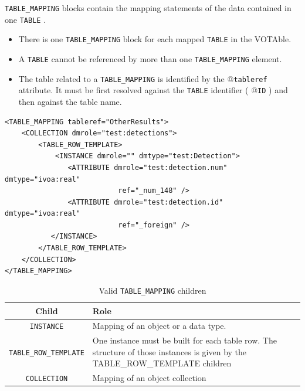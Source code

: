 \documentclass[11pt,a4paper]{ivoa}
\begin{document}
\texttt{TABLE\_MAPPING} blocks contain the mapping statements of the data contained in one \texttt{TABLE} .

\begin{itemize}
    \item There is one \texttt{TABLE\_MAPPING} block for each mapped \texttt{TABLE}  in the VOTAble.    
    \item A \texttt{TABLE} cannot be referenced by more than one \texttt{TABLE\_MAPPING} element.
    \item The table related to a \texttt{TABLE\_MAPPING} is identified by the @\texttt{tableref} attribute. 
            It must be first resolved against the \texttt{TABLE} identifier ( @\texttt{ID} ) and then against the table name.
\end{itemize}

\begin{lstlisting}[caption={TABLE\_MAPPING block example},style=XML]
<TABLE_MAPPING tableref="OtherResults">
    <COLLECTION dmrole="test:detections">
        <TABLE_ROW_TEMPLATE>
            <INSTANCE dmrole="" dmtype="test:Detection">
               <ATTRIBUTE dmrole="test:detection.num" dmtype="ivoa:real"
                           ref="_num_148" />
               <ATTRIBUTE dmrole="test:detection.id" dmtype="ivoa:real"
                           ref="_foreign" />
           </INSTANCE>
        </TABLE_ROW_TEMPLATE>
    </COLLECTION>
</TABLE_MAPPING>
\end{lstlisting}


\begin{table}[!htbp]
\small
\centering
\begin{tabulary}{\linewidth}{|c|J|}       
       \hline 
           \textbf{Child} &  
           \textbf{Role}\\
       \hline         \hline  
           \texttt{INSTANCE}    & 
           Mapping of an object or a data type.  \\              
       \hline  
            \texttt{TABLE\_ROW\_TEMPLATE}    &  
            One instance must be built for each table row. 
             \newline The structure of those instances is given by the TABLE\_ROW\_TEMPLATE children \\              
       \hline  
             \texttt{COLLECTION}    &  
             Mapping of an object collection \\       
       \hline 
     \end{tabulary}
     \caption{Valid \texttt{TABLE\_MAPPING} children} 
     \label{tbl:templ-children}
 \end{table}
\end{document}
